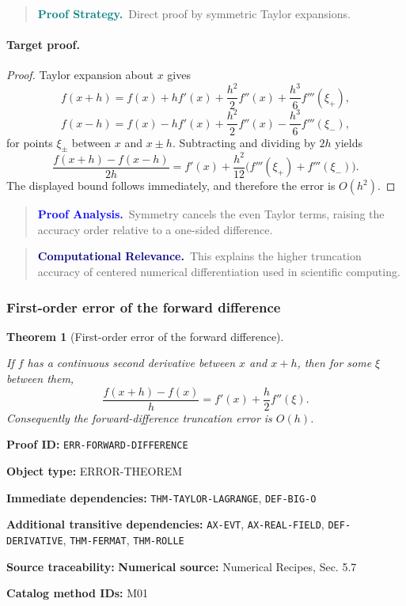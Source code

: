 \documentclass[10pt]{article}
\newcommand{\pidraw}[1]{\begingroup\urlstyle{tt}\nolinkurl{#1}\endgroup}
\newtheorem{theorem}{Theorem}[section]
\theoremstyle{definition}
\theoremstyle{remark}
\newenvironment{proofstrategy}
{\begin{quote}\small\noindent\textbf{\textcolor{teal}{Proof Strategy.}}\ }
{\end{quote}}
\newenvironment{proofanalysis}
{\begin{quote}\small\noindent\textbf{\textcolor{blue}{Proof Analysis.}}\ }
{\end{quote}}
\newenvironment{computationalrelevance}
{\begin{quote}\small\noindent\textbf{\textcolor{navy}{Computational Relevance.}}\ }
{\end{quote}}
\newcommand{\meta}[2]{\noindent\textbf{#1:} #2\par}
\begin{document}
\begin{proofstrategy}Direct proof by symmetric Taylor expansions.\end{proofstrategy}

\paragraph{Target proof.}

\begin{proof}

Taylor expansion about $x$ gives
\[
f(x+h)=f(x)+hf'(x)+\frac{h^2}{2}f''(x)+\frac{h^3}{6}f'''(\xi_+),
\]
\[
f(x-h)=f(x)-hf'(x)+\frac{h^2}{2}f''(x)-\frac{h^3}{6}f'''(\xi_-),
\]
for points $\xi_\pm$ between $x$ and $x\pm h$. Subtracting and dividing by
$2h$ yields
\[
\frac{f(x+h)-f(x-h)}{2h}
=
f'(x)+\frac{h^2}{12}\bigl(f'''(\xi_+)+f'''(\xi_-)\bigr).
\]
The displayed bound follows immediately, and therefore the error is $O(h^2)$.

\end{proof}

\begin{proofanalysis}Symmetry cancels the even Taylor terms, raising the accuracy order relative to a one-sided difference.\end{proofanalysis}

\begin{computationalrelevance}This explains the higher truncation accuracy of centered numerical differentiation used in scientific computing.\end{computationalrelevance}

\subsubsection{First-order error of the forward difference}

\begin{theorem}[First-order error of the forward difference]\label{prf:ERR-FORWARD-DIFFERENCE}

If $f$ has a continuous second derivative between $x$ and $x+h$, then for some $\xi$ between them,
\[
\frac{f(x+h)-f(x)}{h}
=
f'(x)+\frac{h}{2}f''(\xi).
\]
Consequently the forward-difference truncation error is $O(h)$.

\end{theorem}

\meta{Proof ID}{\pidraw{ERR-FORWARD-DIFFERENCE}}
\meta{Object type}{ERROR-THEOREM}
\meta{Immediate dependencies}{\pidraw{THM-TAYLOR-LAGRANGE}, \pidraw{DEF-BIG-O}}
\meta{Additional transitive dependencies}{\pidraw{AX-EVT}, \pidraw{AX-REAL-FIELD}, \pidraw{DEF-DERIVATIVE}, \pidraw{THM-FERMAT}, \pidraw{THM-ROLLE}}
\meta{Source traceability}{\textbf{Numerical source:} Numerical Recipes, Sec. 5.7}
\meta{Catalog method IDs}{M01}
\end{document}
